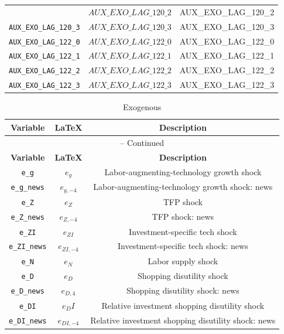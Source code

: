 \begin{center}
\begin{longtable}{ccc}
{\texttt{AUX\_EXO\_LAG\_120\_2} & $AUX\_EXO\_LAG\_120\_2$ & AUX\_EXO\_LAG\_120\_2\\
\texttt{AUX\_EXO\_LAG\_120\_3} & $AUX\_EXO\_LAG\_120\_3$ & AUX\_EXO\_LAG\_120\_3\\
\texttt{AUX\_EXO\_LAG\_122\_0} & $AUX\_EXO\_LAG\_122\_0$ & AUX\_EXO\_LAG\_122\_0\\
\texttt{AUX\_EXO\_LAG\_122\_1} & $AUX\_EXO\_LAG\_122\_1$ & AUX\_EXO\_LAG\_122\_1\\
\texttt{AUX\_EXO\_LAG\_122\_2} & $AUX\_EXO\_LAG\_122\_2$ & AUX\_EXO\_LAG\_122\_2\\
\texttt{AUX\_EXO\_LAG\_122\_3} & $AUX\_EXO\_LAG\_122\_3$ & AUX\_EXO\_LAG\_122\_3\\
\hline%
\end{longtable}
\end{center}
\begin{center}
\begin{longtable}{ccc}
\caption{Exogenous}\\%
\hline%
\multicolumn{1}{c}{\textbf{Variable}} &
\multicolumn{1}{c}{\textbf{\LaTeX}} &
\multicolumn{1}{c}{\textbf{Description}}\\%
\hline\hline%
\endfirsthead
\multicolumn{3}{c}{{\tablename} \thetable{} -- Continued}\\%
\hline%
\multicolumn{1}{c}{\textbf{Variable}} &
\multicolumn{1}{c}{\textbf{\LaTeX}} &
\multicolumn{1}{c}{\textbf{Description}}\\%
\hline\hline%
\endhead
\texttt{e\_g} & ${e_g}$ & Labor-augmenting-technology growth shock\\
\texttt{e\_g\_news} & ${e_{g,-4}}$ & Labor-augmenting-technology growth shock: news\\
\texttt{e\_Z} & ${e_Z}$ & TFP shock\\
\texttt{e\_Z\_news} & ${e_{Z,-4}}$ & TFP shock: news\\
\texttt{e\_ZI} & ${e_{ZI}}$ & Investment-specific tech shock\\
\texttt{e\_ZI\_news} & ${e_{ZI,-4}}$ & Investment-specific tech shock: news\\
\texttt{e\_N} & ${e_N}$ & Labor supply shock\\
\texttt{e\_D} & ${e_D}$ & Shopping disutility shock\\
\texttt{e\_D\_news} & ${e_{D,4}}$ & Shopping disutility shock: news\\
\texttt{e\_DI} & ${e_DI}$ & Relative investment shopping disutility shock\\
\texttt{e\_DI\_news} & ${e_{DI,-4}}$ & Relative investment shopping disutility shock: news\\

\end{longtable}
\end{center}
